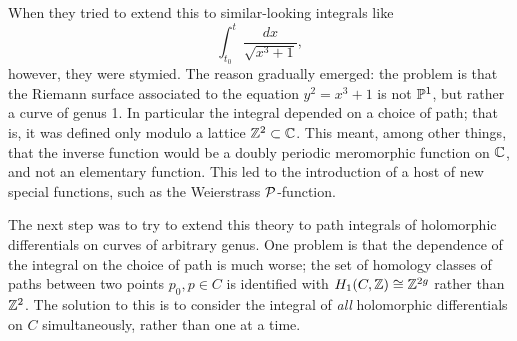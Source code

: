 When they tried to extend this to similar-looking integrals like
$$
\int_{t_0}^t \frac{dx}{\sqrt{x^3+1}},
$$
however, they were stymied. The reason gradually emerged: the problem is that the Riemann surface associated to the equation $y^2 = x^3+1$ is not $\PP^1$, but rather a curve of genus 1. In particular  the integral depended on a choice of path; that is, it was defined only modulo a lattice $\ZZ^2 \subset \CC$. This meant, among other things, that the inverse function would be a doubly periodic meromorphic function on $\CC$, and not an elementary function. This led to the introduction of a host of new special functions, such as the Weierstrass $\sP$-function.

The next step was to try to extend this theory to path integrals of holomorphic differentials on curves of arbitrary genus. One problem is that the dependence of the integral on the choice of path is much worse; the set of homology classes of paths between two points $p_0, p \in C$ is identified with $H_1(C,\ZZ) \cong \ZZ^{2g}$ rather than $\ZZ^2$. The solution to this is to consider the integral of \emph{all} holomorphic differentials on $C$ simultaneously, rather than one at a time.


